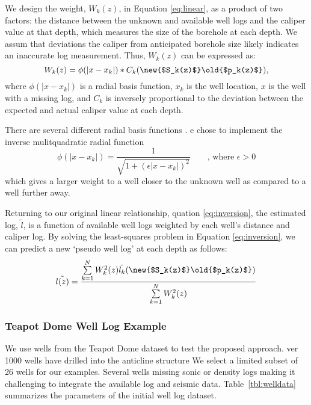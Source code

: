 We design the weight, $W_k(z)$, in Equation \ref{eq:linear}, as a product of two factors: the distance between the unknown and available well logs and the caliper value at that depth, which measures the size of the borehole at each depth. We assum that  deviations the caliper\new{,} from  anticipated borehole size  likely indicates an inaccurate log measurement.   Thus, $W_k(z)$ can be expressed as:
\begin{equation}
W_k(z) = \phi(|x - x_k|)*C_k(\text{\new{$S_k(z)$}\old{$p_k(z)$}}),
\end{equation}
where $\phi(|x - x_k|)$ is a radial basis function, $x_k$ is the well location, $x$ is the well with a missing log, and $C_k$ is inversely proportional to the deviation between the expected and actual caliper value at each depth.

There are several different radial basis functions \cite[]{powell1987radial}. e chose to implement the inverse mulitquadratic radial function 
\begin{equation}\label{eq:mgrbf}
\phi(|x - x_k|) = \dfrac{1}{\sqrt{1 + (\epsilon |x - x_k|)^2}} \qquad\text{, where } \epsilon>0
\end{equation}
which gives a larger weight to a well closer to the unknown well as compared to a well further away.

Returning to our original linear relationship, quation \ref{eq:inversion}, the estimated log, $\tilde{l}$, is a function of available well logs weighted by each well's distance and caliper log. By solving the least-squares problem in Equation \ref{eq:inversion}, we can predict a new `pseudo well log' at each depth as follows:
\begin{equation} \label{eq:solved}
\tilde{l(z)} = \frac{\sum\limits_{k=1}^N W_k^2(z) \hat{l_k}(\text{\new{$S_k(z)$}\old{$p_k(z)$}})}{\sum\limits_{k=1}^N W_k^2(z)}
\end{equation}


\subsubsection{Teapot Dome Well Log Example}
We use wells from the Teapot Dome dataset to test the proposed approach. ver 1000 wells have drilled into the anticline structure We select  a limited subset of 26  wells for our examples. Several wells  missing sonic or density logs making it challenging to integrate the available log and seismic data. Table~\ref{tbl:welldata} summarizes the parameters of the initial well log dataset.

